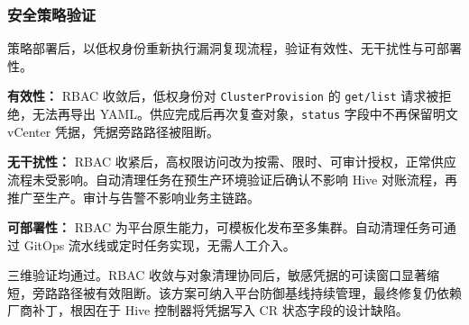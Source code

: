\subsubsection{安全策略验证}

策略部署后，以低权身份重新执行漏洞复现流程，验证有效性、无干扰性与可部署性。

\textbf{有效性：}
RBAC 收敛后，低权身份对 \texttt{ClusterProvision} 的 \texttt{get/list} 请求被拒绝，无法再导出 YAML。供应完成后再次复查对象，\texttt{status} 字段中不再保留明文 vCenter 凭据，凭据旁路路径被阻断。

\textbf{无干扰性：}
RBAC 收紧后，高权限访问改为按需、限时、可审计授权，正常供应流程未受影响。自动清理任务在预生产环境验证后确认不影响 Hive 对账流程，再推广至生产。审计与告警不影响业务主链路。

\textbf{可部署性：}
RBAC 为平台原生能力，可模板化发布至多集群。自动清理任务可通过 GitOps 流水线或定时任务实现，无需人工介入。

三维验证均通过。RBAC 收敛与对象清理协同后，敏感凭据的可读窗口显著缩短，旁路路径被有效阻断。该方案可纳入平台防御基线持续管理，最终修复仍依赖厂商补丁，根因在于 Hive 控制器将凭据写入 CR 状态字段的设计缺陷。

